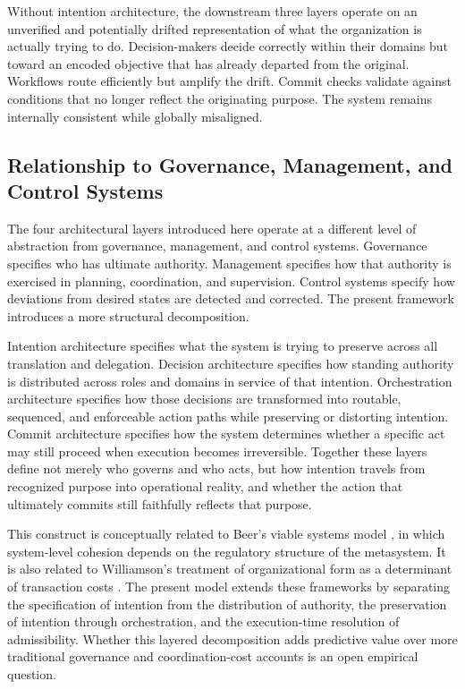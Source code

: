 \documentclass[12pt]{article}
\begin{document}
Without intention architecture, the downstream three layers operate on an
unverified and potentially drifted representation of what the organization
is actually trying to do. Decision-makers decide correctly within their
domains but toward an encoded objective that has already departed from the
original. Workflows route efficiently but amplify the drift. Commit checks
validate against conditions that no longer reflect the originating purpose.
The system remains internally consistent while globally misaligned.

\subsection{Relationship to Governance, Management, and Control Systems}
\label{sec:governance}

The four architectural layers introduced here operate at a different level of
abstraction from governance, management, and control systems. Governance
specifies who has ultimate authority. Management specifies how that authority
is exercised in planning, coordination, and supervision. Control systems
specify how deviations from desired states are detected and corrected. The
present framework introduces a more structural decomposition.

Intention architecture specifies what the system is trying to preserve across
all translation and delegation. Decision architecture specifies how standing
authority is distributed across roles and domains in service of that
intention. Orchestration architecture specifies how those decisions are
transformed into routable, sequenced, and enforceable action paths while
preserving or distorting intention. Commit architecture specifies how the
system determines whether a specific act may still proceed when execution
becomes irreversible. Together these layers define not merely who governs and
who acts, but how intention travels from recognized purpose into operational
reality, and whether the action that ultimately commits still faithfully
reflects that purpose.

This construct is conceptually related to Beer's viable systems model
\citep{beer1972brain}, in which system-level cohesion depends on the
regulatory structure of the metasystem. It is also related to Williamson's
treatment of organizational form as a determinant of transaction costs
\citep{williamson1981economics}. The present model extends these frameworks by
separating the specification of intention from the distribution of authority,
the preservation of intention through orchestration, and the execution-time
resolution of admissibility. Whether this layered decomposition adds
predictive value over more traditional governance and coordination-cost
accounts is an open empirical question.
\end{document}

